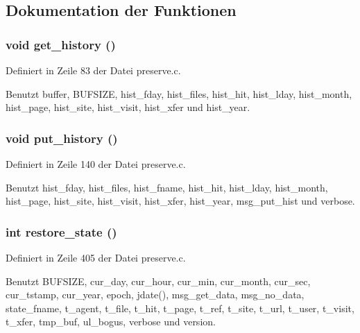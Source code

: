 \subsection{Dokumentation der Funktionen}
\subsubsection{\setlength{\rightskip}{0pt plus 5cm}void get\_\-history ()}\label{preserve_8h_d7ce84df67f8fe6fb2ae68f70445e3ff}




Definiert in Zeile 83 der Datei preserve.c.

Benutzt buffer, BUFSIZE, hist\_\-fday, hist\_\-files, hist\_\-hit, hist\_\-lday, hist\_\-month, hist\_\-page, hist\_\-site, hist\_\-visit, hist\_\-xfer und hist\_\-year.
\subsubsection{\setlength{\rightskip}{0pt plus 5cm}void put\_\-history ()}\label{preserve_8h_0725425e14f501da1e2fc612d7854c01}




Definiert in Zeile 140 der Datei preserve.c.

Benutzt hist\_\-fday, hist\_\-files, hist\_\-fname, hist\_\-hit, hist\_\-lday, hist\_\-month, hist\_\-page, hist\_\-site, hist\_\-visit, hist\_\-xfer, hist\_\-year, msg\_\-put\_\-hist und verbose.
\subsubsection{\setlength{\rightskip}{0pt plus 5cm}int restore\_\-state ()}\label{preserve_8h_87684b62a3f6bfdc76f25d5fb679c901}




Definiert in Zeile 405 der Datei preserve.c.

Benutzt BUFSIZE, cur\_\-day, cur\_\-hour, cur\_\-min, cur\_\-month, cur\_\-sec, cur\_\-tstamp, cur\_\-year, epoch, jdate(), msg\_\-get\_\-data, msg\_\-no\_\-data, state\_\-fname, t\_\-agent, t\_\-file, t\_\-hit, t\_\-page, t\_\-ref, t\_\-site, t\_\-url, t\_\-user, t\_\-visit, t\_\-xfer, tmp\_\-buf, ul\_\-bogus, verbose und version.
